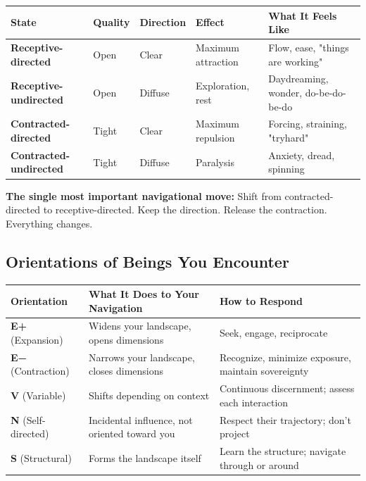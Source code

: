 \begin{longtable}{p{} p{} p{} p{} p{}}
\toprule
\textbf{State} & \textbf{Quality} & \textbf{Direction} & \textbf{Effect} & \textbf{What It Feels Like} \\
\midrule
\endhead
\textbf{Receptive-directed} & Open & Clear & Maximum attraction & Flow, ease, "things are working" \\
\textbf{Receptive-undirected} & Open & Diffuse & Exploration, rest & Daydreaming, wonder, do-be-do-be-do \\
\textbf{Contracted-directed} & Tight & Clear & Maximum repulsion & Forcing, straining, "tryhard" \\
\textbf{Contracted-undirected} & Tight & Diffuse & Paralysis & Anxiety, dread, spinning \\
\bottomrule
\end{longtable}



\textbf{The single most important navigational move:} Shift from contracted-directed to receptive-directed. Keep the direction. Release the contraction. Everything changes.


\subsection*{Orientations of Beings You Encounter}



\begin{longtable}{p{} p{} p{}}
\toprule
\textbf{Orientation} & \textbf{What It Does to Your Navigation} & \textbf{How to Respond} \\
\midrule
\endhead
\textbf{E+} (Expansion) & Widens your landscape, opens dimensions & Seek, engage, reciprocate \\
\textbf{E−} (Contraction) & Narrows your landscape, closes dimensions & Recognize, minimize exposure, maintain sovereignty \\
\textbf{V} (Variable) & Shifts depending on context & Continuous discernment; assess each interaction \\
\textbf{N} (Self-directed) & Incidental influence, not oriented toward you & Respect their trajectory; don't project \\
\textbf{S} (Structural) & Forms the landscape itself & Learn the structure; navigate through or around \\
\bottomrule
\end{longtable}



